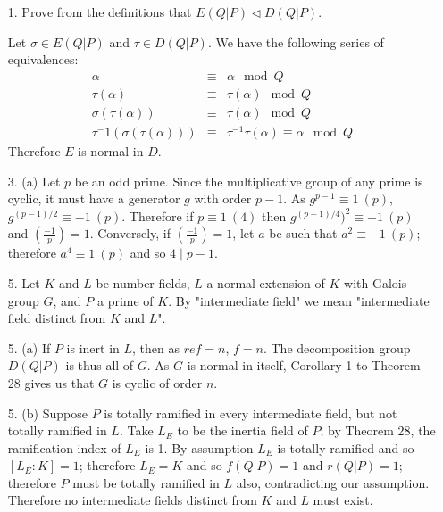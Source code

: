 \documentclass{article}
\newcommand{\modequiv}[3]{#1 \equiv #2\ (#3)}
\begin{document}
\begin{enumerate}
    \item [1.] Prove from the definitions that $E(Q|P) \triangleleft D(Q|P)$.

    Let $\sigma \in E(Q|P)$ and $\tau \in D(Q|P)$.  We have the following series of equivalences:
    \begin{eqnarray*}
        \alpha &\equiv& \alpha\mod Q \\
        \tau(\alpha) &\equiv& \tau(\alpha)\mod Q\\
        \sigma(\tau(\alpha)) &\equiv& \tau(\alpha) \mod Q\\
        \tau^-1(\sigma(\tau(\alpha))) &\equiv& \tau^{-1}\tau(\alpha) \equiv \alpha\mod Q
    \end{eqnarray*}
    Therefore $E$ is normal in $D$.

    \item[3. (a)]
    Let $p$ be an odd prime.  Since the multiplicative group of any prime is cyclic, it must have a generator $g$ with order $p - 1$.  As $\modequiv{g^{p-1}}{1}{p}$, $\modequiv{g^{(p-1)/2}}{-1}{p}$.  Therefore if $\modequiv{p}{1}{4}$ then $\modequiv{g^{(p-1)/4})^2}{-1}{p}$ and $\left(\frac{-1}{p}\right) = 1$.  Conversely, if $\left(\frac{-1}{p}\right) = 1$, let $a$ be such that $\modequiv{a^2}{-1}{p}$; therefore $\modequiv{a^4}{1}{p}$ and so $4 \mid p - 1$.


    \item [5.] Let $K$ and $L$ be number fields, $L$ a normal extension of $K$ with Galois group $G$, and $P$ a prime of $K$.  By "intermediate field" we mean "intermediate field distinct from $K$ and $L$".

    \item [5. (a)] If $P$ is inert in $L$, then as $ref = n$, $f = n$.  The decomposition group $D(Q|P)$ is thus all of $G$.  As $G$ is normal in itself, Corollary 1 to Theorem 28 gives us that $G$ is cyclic of order $n$.
    \item [5. (b)] Suppose $P$ is totally ramified in every intermediate field, but not totally ramified in $L$.  Take $L_E$ to be the inertia field of $P$; by Theorem 28, the ramification index of $L_{E}$ is 1.  By assumption $L_{E}$ is totally ramified and so $[L_{E} : K] = 1$; therefore $L_{E} = K$ and so $f(Q|P) = 1$ and $r(Q|P) = 1$; therefore $P$ must be totally ramified in $L$ also, contradicting our assumption.  Therefore no intermediate fields distinct from $K$ and $L$ must exist.


\end{enumerate}
\end{document}
